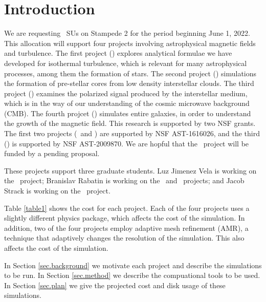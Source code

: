 \section{Introduction}
\label{sec.intro}

We are requesting \SUtotal\ SUs on Stampede 2 for the period beginning June 1,
2022.  This allocation will support four projects involving astrophysical
magnetic fields and turbulence.  The first project (\nameTurbulence) explores analytical
formulae we have developed for isothermal turbulence, which is relevant for many
astrophysical processes, among them the formation of stars.  The second project
(\nameCores) simulations the formation of pre-stellar cores from low density
interstellar clouds.  The third project (\nameCMB) examines the polarized signal
produced by the interstellar medium, which is in the way of our understanding of
the cosmic microwave background (CMB). The fourth projcet (\nameGalaxies)
simulates entire galaxies, in order to understand the growth of the magnetic
field.
This research is supported by two NSF grants.  The first two projects
(\nameTurbulence\ and \nameCores)  
are
supported by NSF AST-1616026, and the third (\nameCMB) is supported by 
NSF AST-2009870.
We are hopful that the \nameGalaxies\ project will be funded by a pending
proposal.


These projects support three graduate students.  Luz Jimenez Vela is working on
the \nameCores\ project; Branislav Rabatin is working on the \nameTurbulence\
and \nameCMB\ projects; and Jacob Strack is working on the \nameGalaxies\
project.


Table \ref{table1} shows the cost for each project.  Each of the four projects
uses a slightly different physics package, which affects  the cost of the
simulation.  In addition, two of the four projects employ adaptive mesh
refinement (AMR), a technique that adaptively changes the resolution of the
simulation.  This also affects the cost of the simulation.

In Section
\ref{sec.background} we motivate each project and describe the simulations to be
run.  In Section \ref{sec.method} we
describe the compuational tools to be used.  In Section \ref{sec.plan} we
give the projected cost  and disk usage of these simulations.

